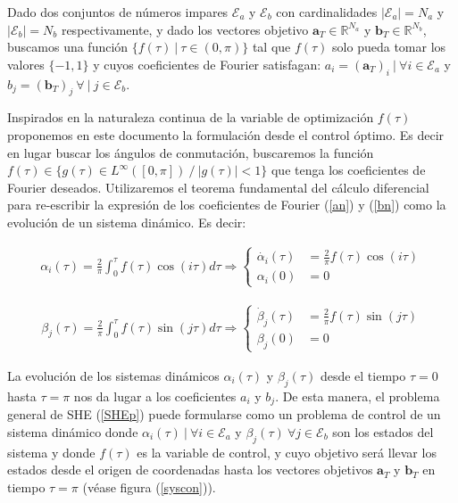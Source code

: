\begin{problem}\label{SHEp}
    Dado dos conjuntos de números impares $\mathcal{E}_a$ y $\mathcal{E}_b$ con cardinalidades $|\mathcal{E}_a| = N_a$ y  $|\mathcal{E}_b| = N_b$ respectivamente, y dado los vectores objetivo $\bm{a}_T  \in \mathbb{R}^{N_a}$ y $\bm{b}_T  \in \mathbb{R}^{N_b}$, buscamos una función  $\{f(\tau ) \ | \ \tau \in (0,\pi)\}$ tal que $f(\tau)$ solo pueda tomar los valores  $\{-1,1\}$ y cuyos coeficientes de Fourier satisfagan: $ a_i = (\bm{a}_T)_i \ | \ \forall i \in \mathcal{E}_a$ y  $b_j = (\bm{b}_T)_j \ \forall \ | \  j \in \mathcal{E}_b$. 
\end{problem}





Inspirados en la naturaleza continua de la variable de optimización $f(\tau)$ proponemos en este documento la formulación desde el control óptimo. Es decir en lugar buscar los ángulos de conmutación, buscaremos la función $f(\tau) \in \{ g(\tau)  \in L^\infty([0,\pi])\ /\ |g(\tau)| < 1\} $ que tenga los coeficientes de Fourier deseados. 
%
Utilizaremos el  teorema fundamental del cálculo diferencial para re-escribir la expresión de los coeficientes de Fourier (\ref{an}) y (\ref{bn}) como la evolución de un sistema dinámico. Es decir:

\begin{gather}
    \alpha_i(\tau) = \frac{2}{\pi}\int_0^\tau f(\tau) \cos(i\tau)d\tau 
    \Rightarrow
    \begin{cases} \label{ode}
        \dot{\alpha_i}(\tau) & = \frac{2}{\pi}f(\tau)\cos(i\tau) \\  
        \alpha_i(0) & = 0       
    \end{cases}
\end{gather}

\begin{gather}
    \beta_j(\tau) = \frac{2}{\pi}\int_0^\tau f(\tau) \sin(j\tau)d\tau 
    \Rightarrow
    \begin{cases} \label{ode}
        \dot{\beta}_j(\tau) & = \frac{2}{\pi}f(\tau)\sin(j\tau) \\  
        \beta_j(0) & = 0       
    \end{cases}
\end{gather}

La evolución de los sistemas dinámicos $\alpha_i(\tau)$ y $\beta_j(\tau)$ desde el tiempo $\tau=0$ hasta $\tau=\pi$ nos da lugar a los coeficientes $a_i$ y $b_j$. 
De esta manera, el problema general de SHE (\ref{SHEp}) puede formularse como un problema de control de un sistema dinámico donde $\alpha_i(\tau) \ | \ \forall i \in \mathcal{E}_a  $ y $ \beta_j(\tau) \ \forall j \in \mathcal{E}_b$ son los estados del sistema y donde $f(\tau)$ es la variable de control, y cuyo objetivo será llevar los estados desde el origen de coordenadas hasta los vectores objetivos $\bm{a}_T$ y $\bm{b}_T$ en tiempo $\tau = \pi$ (véase figura (\ref{syscon})).



